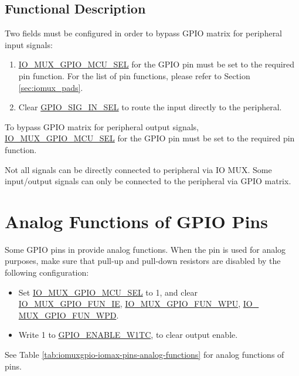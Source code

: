 \documentclass[main\_\_EN.tex]{subfiles}
\begin{document}
\subsection{Functional Description}

Two fields must be configured in order to bypass GPIO matrix for peripheral input signals:

\begin{enumerate}
\item \hyperref[fielddesc:IOMUXGPIONMCUSEL]{IO\_MUX\_GPIO\_MCU\_SEL} for the GPIO pin must be set to the required pin function. For the list of pin functions, please refer to Section  \ref{sec:iomux_pads}.
\item Clear \hyperref[fielddesc:GPIOSIGNINSEL]{GPIO\_SIG\_IN\_SEL} to route the input directly to the peripheral.
\end{enumerate}

To bypass GPIO matrix for peripheral output signals, \hyperref[fielddesc:IOMUXGPIONMCUSEL]{IO\_MUX\_GPIO\_MCU\_SEL} for the GPIO pin must be set to the required pin function.

\begin{tiplisting}
Not all signals can be directly connected to peripheral via IO MUX. Some input/output signals can only be connected to the peripheral via GPIO matrix.
\end{tiplisting}

\section{Analog Functions of GPIO Pins}

Some GPIO pins in \chipname{} provide analog functions. When the pin is used for analog purposes, make sure that pull-up and pull-down resistors are disabled by the following configuration:

\begin{itemize}
    \item Set \hyperref[fielddesc:IOMUXGPIONMCUSEL]{IO\_MUX\_GPIO\_MCU\_SEL} to 1, and clear \hyperref[fielddesc:IOMUXGPIONFUNIE]{IO\_MUX\_GPIO\_FUN\_IE}, \hyperref[fielddesc:IOMUXGPIONFUNWPU]{IO\_MUX\_GPIO\_FUN\_WPU}, \hyperref[fielddesc:IOMUXGPIONFUNWPD]{IO\_\\MUX\_GPIO\_FUN\_WPD}.
    \item Write 1 to \hyperref[fielddesc:GPIOENABLEW1TC]{GPIO\_ENABLE\_W1TC\regindex{[n]}}, to clear output enable.
\end{itemize}
See Table \ref{tab:iomuxgpio-iomax-pins-analog-functions} for analog functions of \chipname{} pins.
\end{document}
